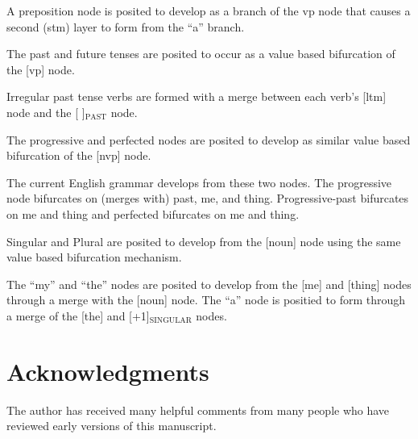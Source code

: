 \documentclass{clv3}
\begin{document}
\begin{unenumerate}
\item A preposition node is posited to develop as a branch of the vp node that causes a second (stm) layer to form from the ``a'' branch. 






\item The past and future tenses are posited to occur as a value based bifurcation of the [vp] node.

\item Irregular past tense verbs are formed with a merge between each verb's [ltm] node and the [ ]$_{\mathrm{PAST} }$  node. 



\item The progressive and perfected nodes are posited to develop as similar value based bifurcation  of the [nvp] node.

\item The current English grammar develops from these two nodes.  The progressive node bifurcates on (merges with) past, me, and thing.    Progressive-past bifurcates on me and thing and perfected bifurcates on me and thing.

\item Singular and Plural are posited to develop from the [noun] node using the same  value based bifurcation mechanism.

\item The ``my'' and ``the'' nodes are posited to develop from the [me] and [thing] nodes through a merge with the [noun] node.   The ``a'' node is positied to form through a merge of the [the] and [+1]$_{\mathrm{SINGULAR}}$ nodes. 
  
\end{unenumerate}







\section{Acknowledgments}


The author has received many helpful comments from many people who have reviewed early versions of this manuscript.
\end{document}
